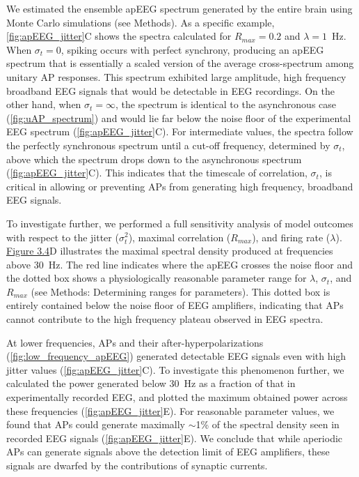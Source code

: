 We estimated the ensemble apEEG spectrum generated by the entire brain using Monte Carlo simulations (see Methods). As a specific example, {\autoref{fig:apEEG_jitter}C} shows the spectra calculated for $R_{max}=0.2$ and $\lambda=1$~\unit{\hertz}. When $\sigma_t=0$, spiking occurs with perfect synchrony, producing an apEEG spectrum that is essentially a scaled version of the average cross-spectrum among unitary AP responses. This spectrum exhibited large amplitude, high frequency broadband EEG signals that would be detectable in EEG recordings. On the other hand, when $\sigma_t=\infty$, the spectrum is identical to the asynchronous case ({\autoref{fig:uAP_spectrum}}) and would lie far below the noise floor of the experimental EEG spectrum ({\autoref{fig:apEEG_jitter}C}). For intermediate values, the spectra follow the perfectly synchronous spectrum until a cut-off frequency, determined by $\sigma_t$, above which the spectrum drops down to the asynchronous spectrum ({\autoref{fig:apEEG_jitter}C}). This indicates that the timescale of correlation, $\sigma_t$, is critical in allowing or preventing APs from generating high frequency, broadband EEG signals.

To investigate further, we performed a full sensitivity analysis of model outcomes with respect to the jitter ($\sigma_t^2$), maximal correlation ($R_{max}$), and firing rate ($\lambda$). \hyperref[fig:apEEG_jitter]{Figure 3.4}D illustrates the maximal spectral density produced at frequencies above 30~\unit{\hertz}. The red line indicates where the apEEG crosses the noise floor and the dotted box shows a physiologically reasonable parameter range for $\lambda$,  $\sigma_t$, and $R_{max}$ (see Methods: Determining ranges for parameters). This dotted box is entirely contained below the noise floor of EEG amplifiers, indicating that APs cannot contribute to the high frequency plateau observed in EEG spectra.

At lower frequencies, APs and their after-hyperpolarizations ({\autoref{fig:low_frequency_apEEG}}) generated detectable EEG signals even with high jitter values ({\autoref{fig:apEEG_jitter}C}). To investigate this phenomenon further, we calculated the power generated below 30~\unit{\hertz} as a fraction of that in experimentally recorded EEG, and plotted the maximum obtained power across these frequencies ({\autoref{fig:apEEG_jitter}E}). For reasonable parameter values, we found that APs could generate maximally ${\sim}$1\% of the spectral density seen in recorded EEG signals ({\autoref{fig:apEEG_jitter}E}). We conclude that while aperiodic APs can generate signals above the detection limit of EEG amplifiers, these signals are dwarfed by the contributions of synaptic currents.

